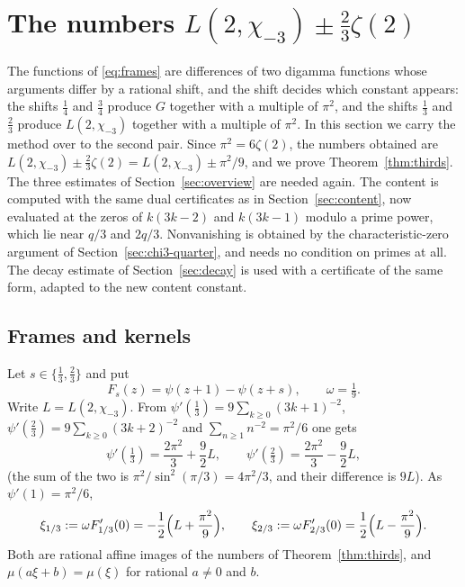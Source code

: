 \section{The numbers $L(2,\chi_{-3})\pm\frac23\zeta(2)$}\label{sec:thirds}

The functions of \eqref{eq:frames} are differences of two digamma functions whose arguments differ by a rational
shift, and the shift decides which constant appears: the shifts $\frac14$ and $\frac34$ produce $G$ together with a
multiple of $\pi^2$, and the shifts $\frac13$ and $\frac23$ produce $L(2,\chi_{-3})$ together with a multiple of $\pi^2$.
In this section we carry the method over to the second pair. Since $\pi^2=6\zeta(2)$, the numbers obtained are
$L(2,\chi_{-3})\pm\frac23\zeta(2)=L(2,\chi_{-3})\pm\pi^2/9$, and we prove Theorem~\ref{thm:thirds}. The three estimates
of Section~\ref{sec:overview} are needed again. The content is computed with the same dual certificates as in
Section~\ref{sec:content}, now evaluated at the zeros of $k(3k-2)$ and $k(3k-1)$ modulo a prime power, which lie near
$q/3$ and $2q/3$. Nonvanishing is obtained by the characteristic-zero argument of
Section~\ref{sec:chi3-quarter}, and needs no condition on primes at all. The decay estimate of
Section~\ref{sec:decay} is used with a certificate of the same form, adapted to the new content constant.

\subsection{Frames and kernels}
Let $s\in\{\frac13,\frac23\}$ and put
\[
 F_s(z)=\psi(z+1)-\psi(z+s),\qquad \omega=\tfrac19 .
\]
Write $L=L(2,\chi_{-3})$. From $\psi'(\tfrac13)=9\sum_{k\ge0}(3k+1)^{-2}$, $\psi'(\tfrac23)=9\sum_{k\ge0}(3k+2)^{-2}$ and
$\sum_{n\ge1}n^{-2}=\pi^2/6$ one gets
\begin{equation}\label{eq:trigamma-thirds}
 \psi'(\tfrac13)=\frac{2\pi^2}3+\frac92L,\qquad \psi'(\tfrac23)=\frac{2\pi^2}3-\frac92L,
\end{equation}
(the sum of the two is $\pi^2/\sin^2(\pi/3)=4\pi^2/3$, and their difference is $9L$). As $\psi'(1)=\pi^2/6$,
\begin{equation}\label{eq:xi-thirds}
 \xi_{1/3}:=\omega F_{1/3}'(0)=-\frac12\Bigl(L+\frac{\pi^2}9\Bigr),\qquad
 \xi_{2/3}:=\omega F_{2/3}'(0)=\frac12\Bigl(L-\frac{\pi^2}9\Bigr).
\end{equation}
Both are rational affine images of the numbers of Theorem~\ref{thm:thirds}, and $\mu(a\xi+b)=\mu(\xi)$ for rational
$a\ne0$ and $b$.

